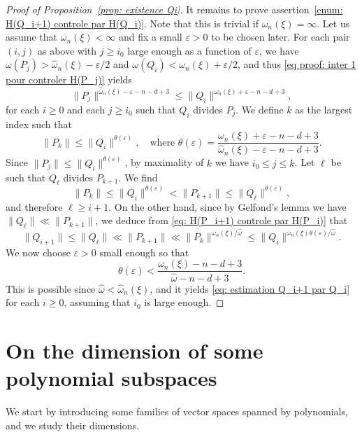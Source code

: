 \documentclass[10pt,a4paper]{amsart}
\numberwithin{equation}{section}
\newcommand\ee{\varepsilon}
\newcommand\homega{\widehat{\omega}}\newcommand\HH{\mathcal{H}}
\newcommand{\normH}[1]{\|#1\|}
\theoremstyle{definition}
\theoremstyle{plain}
\begin{document}
\begin{proof}[Proof of Proposition~\ref{prop: existence Qi}]
It remains to prove assertion~\eqref{enum: H(Q_i+1) controle par H(Q_i)}. Note that this is trivial if $\omega_n(\xi) = \infty$. Let us assume that $\omega_n(\xi) < \infty$ and fix a small $\ee > 0$ to be chosen later. For each pair $(i,j)$ as above with $j \geq i_0$ large enough as a function of $\ee$, we have $\omega(P_j) > \homega_n(\xi)-\ee/2$ and $\omega(Q_i) < \omega_n(\xi)+\ee/2$, and thus \eqref{eq proof: inter 1 pour controler H(P_j)} yields
\begin{equation*}
\normH{P_j}^{\homega_n(\xi)-\ee-n-d+3} \leq \normH{Q_i}^{\omega_n(\xi)+\ee-n-d+3},
\end{equation*}
for each $i \geq 0$ and each $j\geq i_0$ such that $Q_i$ divides $P_j$. We define $k$ as the largest index such that
\begin{equation*}
\normH{P_k} \leq \normH{Q_i}^{\theta(\ee)},\quad \textrm{where } \theta(\ee) = \frac{\omega_n(\xi)+\ee-n-d+3}{\homega_n(\xi)-\ee-n-d+3}.
\end{equation*}
Since $\normH{P_j} \leq \normH{Q_i}^{\theta(\ee)}$, by maximality of $k$ we have $i_0\leq j\leq k$. Let $\ell$ be such that $Q_\ell$ divides $P_{k+1}$. We find
\begin{equation*}
\normH{P_k} \leq \normH{Q_i}^{\theta(\ee)} < \normH{P_{k+1}} \leq \normH{Q_\ell}^{\theta(\ee)},
\end{equation*}
and therefore $\ell \geq i+1$. On the other hand, since by Gelfond's lemma we have $\normH{Q_\ell} \ll \normH{P_{k+1}}$, we deduce from \eqref{eq: H(P_i+1) controle par H(P_i)} that
\begin{equation*}
\normH{Q_{i+1}} \leq \normH{Q_\ell} \ll \normH{P_{k+1}} \ll \normH{P_k}^{\omega_n(\xi)/\homega}\leq \normH{Q_i}^{\omega_n(\xi)\theta(\ee) /\homega}.
\end{equation*}
We now choose $\ee>0$ small enough so that
\begin{equation*}
\theta(\ee) < \frac{\omega_n(\xi)-n-d+3}{\homega -n-d+3}.
\end{equation*}
This is possible since $\homega < \homega_n(\xi)$, and it yields \eqref{eq: estimation Q_i+1 par Q_i} for each $i\geq 0$, assuming that $i_0$ is large enough.
\end{proof}

\section{On the dimension of some polynomial subspaces}
\label{section: espaces V_N}

We start by introducing some families of vector spaces spanned by polynomials, and we study their dimensions.
\end{document}
